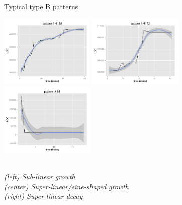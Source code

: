 \begin{figure}[H]
\caption{Typical type B patterns}\label{figure:type_b_pattern}
\caption*{\footnotesize\textit{\\[1em](left) Sub-linear growth\\(center)
Super-linear/sine-shaped growth\\(right) Super-linear decay}\\[1em]}
\centering
	\includegraphics[width=128pt]{images/pattern_b_sub.pdf}
	\hspace{1em}
	\includegraphics[width=128pt]{images/pattern_b_sine.pdf}
	\hspace{1em}
	\includegraphics[width=128pt]{images/pattern_b_super.pdf}
\end{figure}